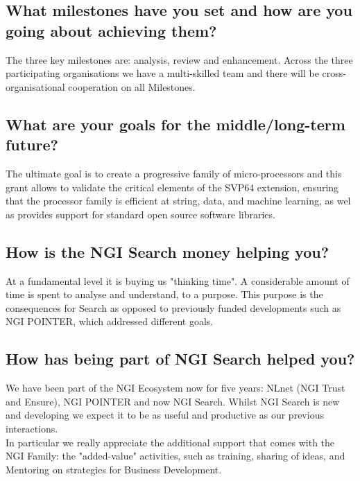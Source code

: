 \subsection{What milestones have you set and how are you going about achieving them?}

The three key milestones are: analysis, review and enhancement.
Across the three participating organisations we have a multi-skilled
team and there will be cross-organisational cooperation on all Milestones.

\subsection{What are your goals for the middle/long-term future?}

The ultimate goal is to create a progressive family of micro-processors
and this grant allows to validate the critical elements of the
SVP64 extension, ensuring that the processor family is efficient at string,
data, and machine learning, as wel as provides support for standard open
source software libraries.

\subsection{How is the NGI Search money helping you?}

At a fundamental level it is buying us "thinking time".
A considerable amount of time is spent to analyse and understand,
to a purpose. This purpose is the consequences for Search as
opposed to previously funded developments such as NGI POINTER,
which addressed different goals.

\subsection{How has being part of NGI Search helped you?}

We have been part of the NGI Ecosystem now for five years:
NLnet (NGI Trust and Ensure), NGI POINTER and now NGI Search.
Whilst NGI Search is new and developing we expect it to be as
useful and productive as our previous interactions.\\

In particular we really appreciate the additional support that
comes with the NGI Family: the "added-value" activities, such
as training, sharing of ideas, and Mentoring on strategies for
Business Development.\\

